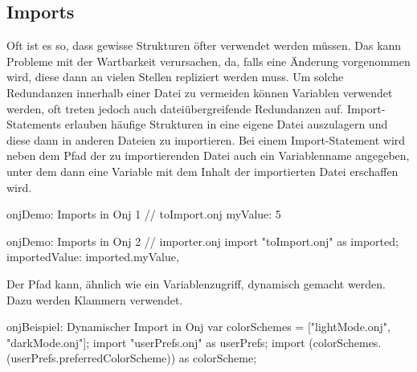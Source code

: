 
\subsection{Imports}\label{subsec:imports}

\renewcommand{\kapitelautor}{Autor: Marvin Kurka}

Oft ist es so, dass gewisse Strukturen öfter verwendet werden müssen.
Das kann Probleme mit der Wartbarkeit verursachen, da, falls eine Änderung vorgenommen wird, diese dann an vielen
Stellen repliziert werden muss.
Um solche Redundanzen innerhalb einer Datei zu vermeiden können Variablen verwendet werden, oft treten jedoch auch
dateiübergreifende Redundanzen auf.
Import-Statements erlauben häufige Strukturen in eine eigene Datei auszulagern und diese dann in anderen Dateien zu
importieren.
Bei einem Import-Statement wird neben dem Pfad der zu importierenden Datei auch ein Variablenname angegeben, unter dem
dann eine Variable mit dem Inhalt der importierten Datei erschaffen wird.

\begin{codeBlock}{onj}{Demo: Imports in Onj 1}
// toImport.onj
myValue: 5
\end{codeBlock}

\begin{codeBlock}{onj}{Demo: Imports in Onj 2}
// importer.onj
import "toImport.onj" as imported;
importedValue: imported.myValue,
\end{codeBlock}

Der Pfad kann, ähnlich wie ein Variablenzugriff, dynamisch gemacht werden.
Dazu werden Klammern verwendet.

\begin{codeBlock}{onj}{Beispiel: Dynamischer Import in Onj}
var colorSchemes = ["lightMode.onj", "darkMode.onj"];
import "userPrefs.onj" as userPrefs;
import (colorSchemes.(userPrefs.preferredColorScheme)) as colorScheme;
\end{codeBlock}

\renewcommand{\kapitelautor}{}
